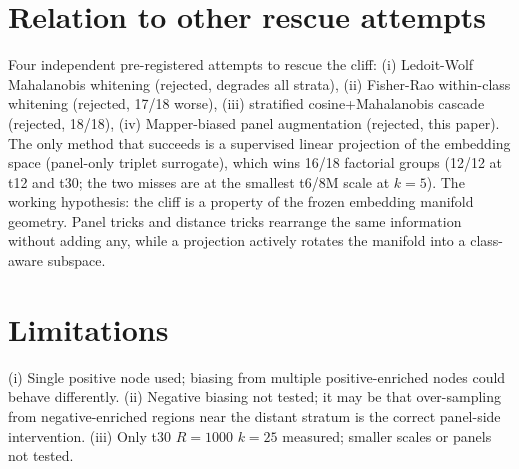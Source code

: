 \documentclass[11pt]{article}
\begin{document}
\section{Relation to other rescue attempts}
Four independent pre-registered attempts to rescue the cliff: (i) Ledoit-Wolf Mahalanobis whitening (rejected, degrades all strata), (ii) Fisher-Rao within-class whitening (rejected, 17/18 worse), (iii) stratified cosine+Mahalanobis cascade (rejected, 18/18), (iv) Mapper-biased panel augmentation (rejected, this paper). The only method that succeeds is a supervised linear projection of the embedding space (panel-only triplet surrogate), which wins 16/18 factorial groups (12/12 at t12 and t30; the two misses are at the smallest t6/8M scale at $k=5$). The working hypothesis: the cliff is a property of the frozen embedding manifold geometry. Panel tricks and distance tricks rearrange the same information without adding any, while a projection actively rotates the manifold into a class-aware subspace.

\section{Limitations}
(i) Single positive node used; biasing from multiple positive-enriched nodes could behave differently. (ii) Negative biasing not tested; it may be that over-sampling from negative-enriched regions near the distant stratum is the correct panel-side intervention. (iii) Only t30 $R{=}1000$ $k{=}25$ measured; smaller scales or panels not tested.
\end{document}
